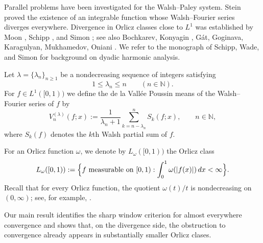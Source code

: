 \documentclass[11pt]{amsart}
\numberwithin{equation}{section}
\theoremstyle{plain}
\begin{document}
Parallel problems have been investigated for the Walsh--Paley system. Stein 
\cite{Stein} proved the existence of an integrable function whose
Walsh--Fourier series diverges everywhere. Divergence in Orlicz classes
close to $L^{1}$ was established by Moon \cite{Moon}, Schipp \cite%
{Schipp-divergence}, and Simon \cite{Simon}; see also Bochkarev, \cite%
{Bochkarev} Konyagin \cite{Konyagin-Walsh}, G\'at, Goginava, Karagulyan,
Mukhamedov, Oniani \cite{GGK-Div,GogProcDiv,GogJMAA-Div,GogOnDiv}. We refer
to the monograph of Schipp, Wade, and Simon \cite{Schipp-Wade-Simon} for
background on dyadic harmonic analysis.

Let $\lambda=\{\lambda_n\}_{n\ge1}$ be a nondecreasing sequence of integers
satisfying 
\begin{equation}  \label{eq:lambda-basic}
1\le \lambda_n \le n \qquad (n\in\mathbb{N}).
\end{equation}
For $f\in L^{1}([0,1))$ we define the de la Vall\'ee Poussin means of the
Walsh--Fourier series of $f$ by 
\begin{equation}  \label{eq:vp-def}
V_n^{(\lambda)}(f;x):=\frac{1}{\lambda_n+1}\sum_{k=n-\lambda_n}^{n}
S_k(f;x), \qquad n\in\mathbb{N},
\end{equation}
where $S_k(f)$ denotes the $k$th Walsh partial sum of $f$.

For an Orlicz function $\omega$, we denote by $L_{\omega}([0,1))$ the Orlicz
class 
\begin{equation*}
L_{\omega}([0,1)):=\Bigl\{f \text{ measurable on }[0,1): \int_0^1
\omega(|f(x)|)\,dx<\infty\Bigr\}.
\end{equation*}
Recall that for every Orlicz function, the quotient $\omega(t)/t$ is
nondecreasing on $(0,\infty)$; see, for example, \cite[Ch.~1]%
{Krasnoselskii-Rutickii}.

Our main result identifies the sharp window criterion for almost everywhere
convergence and shows that, on the divergence side, the obstruction to
convergence already appears in substantially smaller Orlicz clases.
\end{document}
